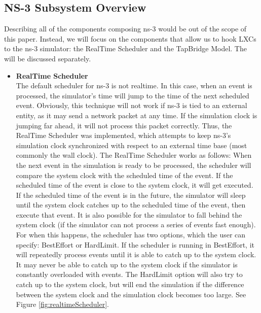 \subsection{NS-3 Subsystem Overview}
Describing all of the components composing ns-3 would be out of the scope of this paper. Instead, we will focus on the components that allow us to hook LXCs to the ns-3 simulator: the RealTime Scheduler and the TapBridge Model. The will be discussed separately.
\begin{itemize} 
                        \item \textbf{RealTime Scheduler} \\ 
                        The default scheduler for ns-3 is not realtime. In this case, when an event is processed, the simulator's time will jump to the time of the next scheduled event. Obviously, this technique will not work if ns-3 is tied to an external entity, as it may send a network packet at any time. If the simulation clock is jumping far ahead, it will not process this packet correctly. Thus, the RealTime Scheduler was implemented, which attempts to keep ns-3's simulation clock synchronized with respect to an external time base (most commonly the wall clock). The RealTime Scheduler works as follows: When the next event in the simulation is ready to be processed, the scheduler will compare the system clock with the scheduled time of the event. If the scheduled time of the event is close to the system clock, it will get executed. If the scheduled time of the event is in the future, the simulator will sleep until the system clock catches up to the scheduled time of the event, then execute that event. It is also possible for the simulator to fall behind the system clock (if the simulator can not process a series of events fast enough). For when this happens, the scheduler has two options, which the user can specify: BestEffort or HardLimit. If the scheduler is running in BestEffort, it will repeatedly process events until it is able to catch up to the system clock. It may never be able to catch up to the system clock if the simulator is constantly overloaded with events. The HardLimit option will also try to catch up to the system clock, but will end the simulation if the difference between the system clock and the simulation clock becomes too large. See Figure \ref{fig:realtimeScheduler}.


\end{itemize}
